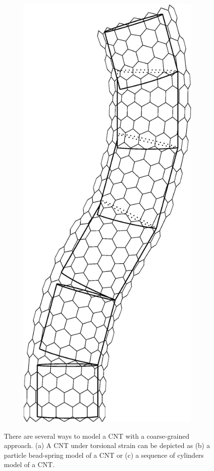 \begin{figure}[t!]
\begin{subfigure}[t]{.33\textwidth}
			\centering
			\includegraphics[scale=.25]{./fig/ch1/NanotubeCylinder.eps}
			\caption{\label{subfig:NanotubeCylinder}}
		\end{subfigure}
		\caption{There are several ways to model a CNT with a coarse-grained approach. (a) A CNT under torsional strain can be depicted as (b) a particle bead-spring model of a CNT or (c) a sequence of cylinders model of a CNT. \label{fig:CoarseGrain}}	
	\end{figure}

